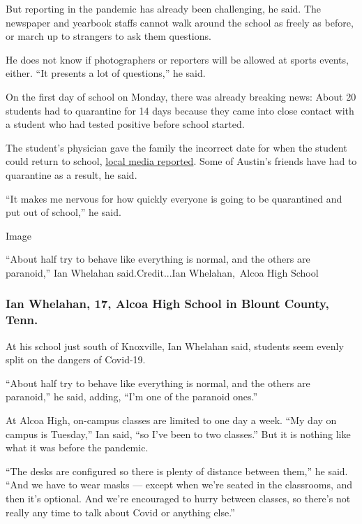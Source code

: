 But reporting in the pandemic has already been challenging, he said. The
newspaper and yearbook staffs cannot walk around the school as freely as
before, or march up to strangers to ask them questions.

He does not know if photographers or reporters will be allowed at sports
events, either. ``It presents a lot of questions,'' he said.

On the first day of school on Monday, there was already breaking news:
About 20 students had to quarantine for 14 days because they came into
close contact with a student who had tested positive before school
started.

The student's physician gave the family the incorrect date for when the
student could return to school,
\href{https://www.indystar.com/story/news/education/2020/08/03/new-palestine-high-school-sees-coronavirus-case-first-day-school/5575437002/}{local
media reported}. Some of Austin's friends have had to quarantine as a
result, he said.

``It makes me nervous for how quickly everyone is going to be
quarantined and put out of school,'' he said.

Image

``About half try to behave like everything is normal, and the others are
paranoid,'' Ian Whelahan said.Credit...Ian Whelahan,~Alcoa High School

\hypertarget{ian-whelahan-17-alcoa-high-school-in-blount-county-tenn}{%
\subsubsection{Ian Whelahan, 17, Alcoa High School in Blount County,
Tenn.}\label{ian-whelahan-17-alcoa-high-school-in-blount-county-tenn}}

At his school just south of Knoxville, Ian Whelahan said, students seem
evenly split on the dangers of Covid-19.

``About half try to behave like everything is normal, and the others are
paranoid,'' he said, adding, ``I'm one of the paranoid ones.''

At Alcoa High, on-campus classes are limited to one day a week. ``My day
on campus is Tuesday,'' Ian said, ``so I've been to two classes.'' But
it is nothing like what it was before the pandemic.

``The desks are configured so there is plenty of distance between
them,'' he said. ``And we have to wear masks --- except when we're
seated in the classrooms, and then it's optional. And we're encouraged
to hurry between classes, so there's not really any time to talk about
Covid or anything else.''

